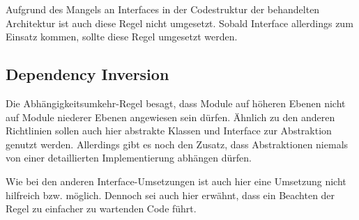 {	Aufgrund des Mangels an Interfaces in der Codestruktur der behandelten Architektur ist auch diese Regel nicht umgesetzt. Sobald Interface allerdings zum Einsatz kommen, sollte diese Regel umgesetzt werden.
	
	\subsection{Dependency Inversion}
	Die Abhängigkeitsumkehr-Regel besagt, dass Module auf höheren Ebenen nicht auf Module niederer Ebenen angewiesen sein dürfen. Ähnlich zu den anderen Richtlinien sollen auch hier abstrakte Klassen und Interface zur Abstraktion genutzt werden.
	Allerdings gibt es noch den Zusatz, dass Abstraktionen niemals von einer detaillierten Implementierung abhängen dürfen.

	Wie bei den anderen Interface-Umsetzungen ist auch hier eine Umsetzung nicht hilfreich bzw. möglich. Dennoch sei auch hier erwähnt, dass ein Beachten der Regel zu einfacher zu wartenden Code führt.
}